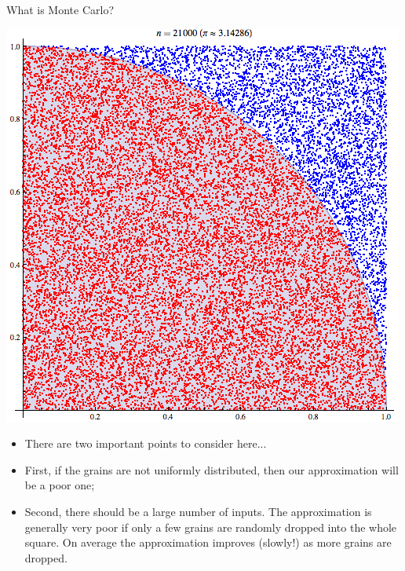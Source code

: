 \documentclass[11pt]{beamer}
\begin{document}
\begin{frame}{What is Monte Carlo?}
\noindent\begin{minipage}{0.5\textwidth}%
\includegraphics[width=\linewidth]{img/pi_greco_3.png}
\end{minipage}%
\hfill%
\begin{minipage}{0.5\textwidth}
\begin{itemize}
\item There are two important points  to consider here...
\item First, if the grains are not uniformly distributed, then our approximation will be a poor one;
\item Second, there should be a large number of inputs. The approximation is generally very poor if only a few grains are randomly dropped into the whole square. On average the approximation improves (slowly!) as more grains are dropped.
\end{itemize}
\end{minipage}
\end{frame}
\end{document}
